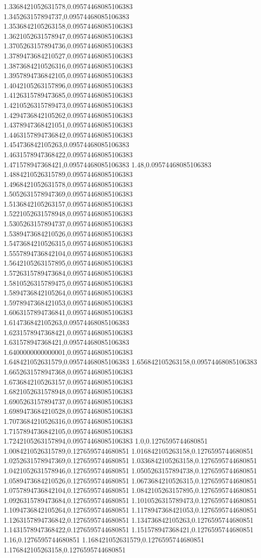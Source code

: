 1.3368421052631578,0.09574468085106383
1.345263157894737,0.09574468085106383
1.3536842105263158,0.09574468085106383
1.3621052631578947,0.09574468085106383
1.3705263157894736,0.09574468085106383
1.3789473684210527,0.09574468085106383
1.3873684210526316,0.09574468085106383
1.3957894736842105,0.09574468085106383
1.4042105263157896,0.09574468085106383
1.4126315789473685,0.09574468085106383
1.4210526315789473,0.09574468085106383
1.4294736842105262,0.09574468085106383
1.4378947368421051,0.09574468085106383
1.4463157894736842,0.09574468085106383
1.454736842105263,0.09574468085106383
1.4631578947368422,0.09574468085106383
1.471578947368421,0.09574468085106383
1.48,0.09574468085106383
1.4884210526315789,0.09574468085106383
1.4968421052631578,0.09574468085106383
1.5052631578947369,0.09574468085106383
1.5136842105263157,0.09574468085106383
1.5221052631578948,0.09574468085106383
1.5305263157894737,0.09574468085106383
1.5389473684210526,0.09574468085106383
1.5473684210526315,0.09574468085106383
1.5557894736842104,0.09574468085106383
1.5642105263157895,0.09574468085106383
1.5726315789473684,0.09574468085106383
1.5810526315789475,0.09574468085106383
1.5894736842105264,0.09574468085106383
1.5978947368421053,0.09574468085106383
1.6063157894736841,0.09574468085106383
1.614736842105263,0.09574468085106383
1.6231578947368421,0.09574468085106383
1.631578947368421,0.09574468085106383
1.6400000000000001,0.09574468085106383
1.648421052631579,0.09574468085106383
1.656842105263158,0.09574468085106383
1.6652631578947368,0.09574468085106383
1.6736842105263157,0.09574468085106383
1.6821052631578948,0.09574468085106383
1.6905263157894737,0.09574468085106383
1.6989473684210528,0.09574468085106383
1.7073684210526316,0.09574468085106383
1.7157894736842105,0.09574468085106383
1.7242105263157894,0.09574468085106383
1.0,0.1276595744680851
1.0084210526315789,0.1276595744680851
1.016842105263158,0.1276595744680851
1.0252631578947369,0.1276595744680851
1.0336842105263158,0.1276595744680851
1.0421052631578946,0.1276595744680851
1.0505263157894738,0.1276595744680851
1.0589473684210526,0.1276595744680851
1.0673684210526315,0.1276595744680851
1.0757894736842104,0.1276595744680851
1.0842105263157895,0.1276595744680851
1.0926315789473684,0.1276595744680851
1.1010526315789473,0.1276595744680851
1.1094736842105264,0.1276595744680851
1.1178947368421053,0.1276595744680851
1.1263157894736842,0.1276595744680851
1.134736842105263,0.1276595744680851
1.1431578947368422,0.1276595744680851
1.151578947368421,0.1276595744680851
1.16,0.1276595744680851
1.168421052631579,0.1276595744680851
1.176842105263158,0.1276595744680851
